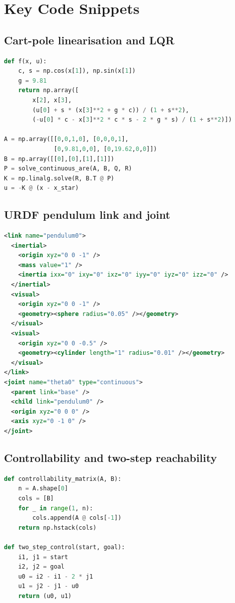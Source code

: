 \documentclass[11pt]{article}
\begin{document}
\appendix
\section{Key Code Snippets}

\subsection{Cart-pole linearisation and LQR}

\begin{lstlisting}[language=Python]
def f(x, u):
    c, s = np.cos(x[1]), np.sin(x[1])
    g = 9.81
    return np.array([
        x[2], x[3],
        (u[0] + s * (x[3]**2 + g * c)) / (1 + s**2),
        (-u[0] * c - x[3]**2 * c * s - 2 * g * s) / (1 + s**2)])

A = np.array([[0,0,1,0], [0,0,0,1],
              [0,9.81,0,0], [0,19.62,0,0]])
B = np.array([[0],[0],[1],[1]])
P = solve_continuous_are(A, B, Q, R)
K = np.linalg.solve(R, B.T @ P)
u = -K @ (x - x_star)
\end{lstlisting}

\subsection{URDF pendulum link and joint}

\begin{lstlisting}[language=XML]
<link name="pendulum0">
  <inertial>
    <origin xyz="0 0 -1" />
    <mass value="1" />
    <inertia ixx="0" ixy="0" ixz="0" iyy="0" iyz="0" izz="0" />
  </inertial>
  <visual>
    <origin xyz="0 0 -1" />
    <geometry><sphere radius="0.05" /></geometry>
  </visual>
  <visual>
    <origin xyz="0 0 -0.5" />
    <geometry><cylinder length="1" radius="0.01" /></geometry>
  </visual>
</link>
<joint name="theta0" type="continuous">
  <parent link="base" />
  <child link="pendulum0" />
  <origin xyz="0 0 0" />
  <axis xyz="0 -1 0" />
</joint>
\end{lstlisting}

\subsection{Controllability and two-step reachability}

\begin{lstlisting}[language=Python]
def controllability_matrix(A, B):
    n = A.shape[0]
    cols = [B]
    for _ in range(1, n):
        cols.append(A @ cols[-1])
    return np.hstack(cols)

def two_step_control(start, goal):
    i1, j1 = start
    i2, j2 = goal
    u0 = i2 - i1 - 2 * j1
    u1 = j2 - j1 - u0
    return (u0, u1)
\end{lstlisting}
\end{document}
